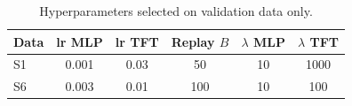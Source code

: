 \begin{table}[t]
  \centering
  \caption{Hyperparameters selected on validation data only.}
  \label{tab:hyper}
  \begin{tabular}{lccccc}
    \toprule
    Data & lr MLP & lr TFT & Replay $B$ & $\lambda$ MLP & $\lambda$ TFT \\
    \midrule
    S1 & 0.001 & 0.03 & 50 & 10 & 1000 \\
    S6 & 0.003 & 0.01 & 100 & 10 & 100 \\
    \bottomrule
  \end{tabular}
\end{table}
